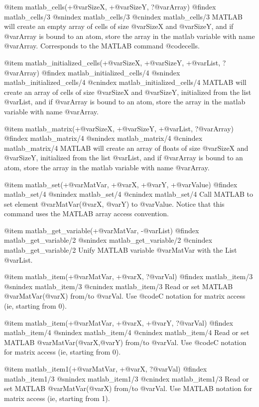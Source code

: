 @item matlab_cells(+@var{SizeX}, +@var{SizeY}, ?@var{Array})
@findex matlab_cells/3
@snindex matlab_cells/3
@cnindex matlab_cells/3
MATLAB will create an empty array of cells of size @var{SizeX} and
@var{SizeY}, and if @var{Array} is bound to an atom, store the array
in the matlab variable with name @var{Array}.  Corresponds to the
MATLAB command @code{cells}.

@item matlab_initialized_cells(+@var{SizeX}, +@var{SizeY}, +@var{List}, ?@var{Array})
@findex matlab_initialized_cells/4
@snindex matlab_initialized_cells/4
@cnindex matlab_initialized_cells/4
MATLAB will create an array of cells of size @var{SizeX} and
@var{SizeY}, initialized from the list @var{List}, and if @var{Array}
is bound to an atom, store the array in the matlab variable with name
@var{Array}.

@item matlab_matrix(+@var{SizeX}, +@var{SizeY}, +@var{List}, ?@var{Array})
@findex matlab_matrix/4
@snindex matlab_matrix/4
@cnindex matlab_matrix/4
MATLAB will create an array of floats of size @var{SizeX} and @var{SizeY},
initialized from the list @var{List}, and if @var{Array} is bound to
an atom, store the array in the matlab variable with name @var{Array}.

@item matlab_set(+@var{MatVar}, +@var{X}, +@var{Y}, +@var{Value})
@findex matlab_set/4
@snindex matlab_set/4
@cnindex matlab_set/4
Call MATLAB to set element @var{MatVar}(@var{X}, @var{Y}) to
@var{Value}. Notice that this command uses the MATLAB array access
convention.

@item matlab_get_variable(+@var{MatVar}, -@var{List})
@findex matlab_get_variable/2
@snindex matlab_get_variable/2
@cnindex matlab_get_variable/2
Unify MATLAB variable @var{MatVar} with the List @var{List}.

@item matlab_item(+@var{MatVar}, +@var{X}, ?@var{Val})
@findex matlab_item/3
@snindex matlab_item/3
@cnindex matlab_item/3
Read or set MATLAB @var{MatVar}(@var{X}) from/to @var{Val}. Use
@code{C} notation for matrix access (ie, starting from 0).

@item matlab_item(+@var{MatVar}, +@var{X}, +@var{Y}, ?@var{Val})
@findex matlab_item/4
@snindex matlab_item/4
@cnindex matlab_item/4
Read or set MATLAB @var{MatVar}(@var{X},@var{Y}) from/to @var{Val}. Use
@code{C} notation for matrix access (ie, starting from 0).

@item matlab_item1(+@var{MatVar}, +@var{X}, ?@var{Val})
@findex matlab_item1/3
@snindex matlab_item1/3
@cnindex matlab_item1/3
Read or set MATLAB @var{MatVar}(@var{X}) from/to @var{Val}. Use
MATLAB notation for matrix access (ie, starting from 1).

